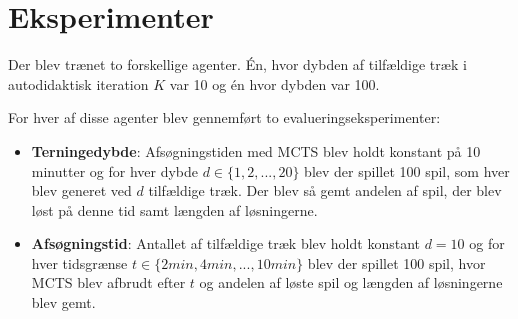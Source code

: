 \documentclass[../main.tex]{subfiles}
\begin{document}
\section{Eksperimenter}
Der blev trænet to forskellige agenter. Én, hvor dybden af tilfældige træk i autodidaktisk iteration \(K\) var 10 og én hvor dybden var 100. 

For hver af disse agenter blev gennemført to evalueringseksperimenter:
\begin{itemize}
	\item \textbf{Terningedybde}: Afsøgningstiden med MCTS blev holdt konstant på 10 minutter og for hver dybde \(d\in \{1,2,...,20\}\) blev der spillet 100 spil, som hver blev generet ved \(d\) tilfældige træk. Der blev så gemt andelen af spil, der blev løst på denne tid samt længden af løsningerne.
	\item \textbf{Afsøgningstid}: Antallet af tilfældige træk blev holdt konstant \(d=10\) og for hver tidsgrænse \(t\in \{2\unit{min}, 4\unit{min}, ..., 10\unit{min}\}\) blev der spillet 100 spil, hvor MCTS blev afbrudt efter \(t\) og andelen af løste spil og længden af løsningerne blev gemt.
\end{itemize}
\end{document}
